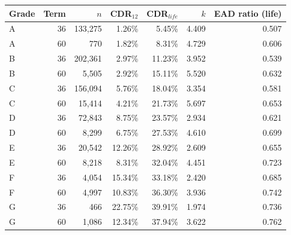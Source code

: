 \begin{tabular}{lrrrrrr}
\toprule
Grade & Term & $n$ & CDR$_{12}$ & CDR$_{life}$ & $k$ & EAD ratio (life) \\
\midrule
A & 36 & 133,275 & 1.26\% & 5.45\% & 4.409 & 0.507 \\
A & 60 & 770 & 1.82\% & 8.31\% & 4.729 & 0.606 \\
B & 36 & 202,361 & 2.97\% & 11.23\% & 3.952 & 0.539 \\
B & 60 & 5,505 & 2.92\% & 15.11\% & 5.520 & 0.632 \\
C & 36 & 156,094 & 5.76\% & 18.04\% & 3.354 & 0.581 \\
C & 60 & 15,414 & 4.21\% & 21.73\% & 5.697 & 0.653 \\
D & 36 & 72,843 & 8.75\% & 23.57\% & 2.934 & 0.621 \\
D & 60 & 8,299 & 6.75\% & 27.53\% & 4.610 & 0.699 \\
E & 36 & 20,542 & 12.26\% & 28.92\% & 2.609 & 0.655 \\
E & 60 & 8,218 & 8.31\% & 32.04\% & 4.451 & 0.723 \\
F & 36 & 4,054 & 15.34\% & 33.18\% & 2.420 & 0.685 \\
F & 60 & 4,997 & 10.83\% & 36.30\% & 3.936 & 0.742 \\
G & 36 & 466 & 22.75\% & 39.91\% & 1.974 & 0.736 \\
G & 60 & 1,086 & 12.34\% & 37.94\% & 3.622 & 0.762 \\
\bottomrule
\end{tabular}
